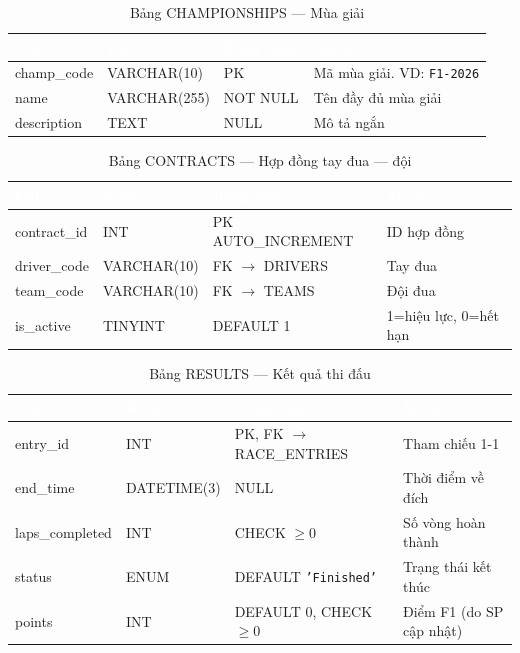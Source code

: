 \documentclass[13pt, a4paper]{report}
\begin{document}
\begin{table}[h]
\centering\small
\caption{Bảng CHAMPIONSHIPS --- Mùa giải}
\begin{tabularx}{\textwidth}{L{2.8cm} L{2.8cm} L{2.5cm} L{5cm}}
\toprule
{}
\textcolor{white}{\textbf{Cột}} & \textcolor{white}{\textbf{Kiểu}} &
\textcolor{white}{\textbf{Ràng buộc}} & \textcolor{white}{\textbf{Mô tả}} \\
\midrule
champ\_code & VARCHAR(10) & PK & Mã mùa giải. VD: \texttt{F1-2026} \\
name & VARCHAR(255) & NOT NULL & Tên đầy đủ mùa giải \\
description & TEXT & NULL & Mô tả ngắn \\
\bottomrule
\end{tabularx}
\end{table}

\begin{table}[h]
\centering\small
\caption{Bảng CONTRACTS --- Hợp đồng tay đua --- đội}
\begin{tabularx}{\textwidth}{L{2.8cm} L{2.8cm} L{3.5cm} L{4.5cm}}
\toprule
{}
\textcolor{white}{\textbf{Cột}} & \textcolor{white}{\textbf{Kiểu}} &
\textcolor{white}{\textbf{Ràng buộc}} & \textcolor{white}{\textbf{Mô tả}} \\
\midrule
contract\_id & INT & PK AUTO\_INCREMENT & ID hợp đồng \\
driver\_code & VARCHAR(10) & FK $\to$ DRIVERS & Tay đua \\
team\_code & VARCHAR(10) & FK $\to$ TEAMS & Đội đua \\
is\_active & TINYINT & DEFAULT 1 & 1=hiệu lực, 0=hết hạn \\
\bottomrule
\end{tabularx}
\end{table}

\begin{table}[h]
\centering\small
\caption{Bảng RESULTS --- Kết quả thi đấu}
\begin{tabularx}{\textwidth}{L{2.8cm} L{2.8cm} L{3.5cm} L{4.5cm}}
\toprule
{}
\textcolor{white}{\textbf{Cột}} & \textcolor{white}{\textbf{Kiểu}} &
\textcolor{white}{\textbf{Ràng buộc}} & \textcolor{white}{\textbf{Mô tả}} \\
\midrule
entry\_id & INT & PK, FK $\to$ RACE\_ENTRIES & Tham chiếu 1-1 \\
end\_time & DATETIME(3) & NULL & Thời điểm về đích \\
laps\_completed & INT & CHECK $\geq 0$ & Số vòng hoàn thành \\
status & ENUM & DEFAULT \texttt{'Finished'} & Trạng thái kết thúc \\
points & INT & DEFAULT 0, CHECK $\geq 0$ & Điểm F1 (do SP cập nhật) \\
\bottomrule
\end{tabularx}
\end{table}
\end{document}
